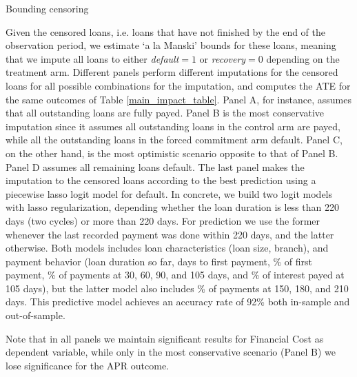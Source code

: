 \begin{table}[H]
\caption{Bounding censoring} 
\label{bounding_censoring}
\begin{center}
\resizebox{1.0\textwidth}{!}{
\scriptsize{}
}
\end{center}
 
\end{table}
\begin{table}[H]
\begin{center}
\resizebox{1.0\textwidth}{!}{
\scriptsize{}
}
\end{center}
 
 \scriptsize {
 Given the censored loans, i.e. loans that have not finished by the end of the observation period, we estimate `a la Manski' bounds for these loans, meaning that we impute all loans to either \emph{default}$=1$ or \emph{recovery}$=0$ depending on the treatment arm. Different panels perform different imputations for the censored loans for all possible combinations for the imputation, and computes the ATE for the same outcomes of Table \ref{main_impact_table}. Panel A, for instance, assumes that all outstanding loans are fully payed. Panel B is the most conservative imputation since it assumes all outstanding loans in the control arm are payed, while all the outstanding loans in the forced commitment arm default. Panel C, on the other hand, is the most optimistic scenario opposite to that of Panel B. Panel D assumes all remaining loans default. The last panel makes the imputation to the censored loans according to the best prediction using a piecewise lasso logit model for default. In concrete, we build two logit models with lasso regularization, depending whether the loan duration is less than 220 days (two cycles) or more than 220 days. For prediction we use the former whenever the last recorded payment was done within 220 days, and the latter otherwise. Both models includes loan characteristics (loan size, branch), and payment behavior (loan duration so far, days to first payment, \% of first payment, \% of payments at 30, 60, 90, and 105 days, and \% of interest payed at 105 days), but the latter model also includes \% of payments at 150, 180, and 210 days. This predictive model achieves an accuracy rate of 92\% both in-sample and out-of-sample.

\noindent Note that in all panels we maintain significant results for Financial Cost as dependent variable, while only in the most conservative scenario (Panel B) we lose significance for the APR outcome. }
\end{table}

